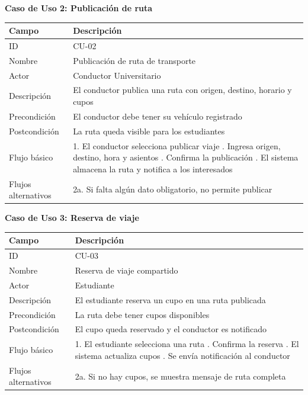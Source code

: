 \documentclass[11pt,a4paper]{article}
\begin{document}
\textbf{Caso de Uso 2: Publicación de ruta}

\begin{tabularx}{\textwidth}{|l|X|}
\hline
\textbf{Campo} & \textbf{Descripción} \\
\hline
ID & CU-02 \\
\hline
Nombre & Publicación de ruta de transporte \\
\hline
Actor & Conductor Universitario \\
\hline
Descripción & El conductor publica una ruta con origen, destino, horario y cupos \\
\hline
Precondición & El conductor debe tener su vehículo registrado \\
\hline
Postcondición & La ruta queda visible para los estudiantes \\
\hline
Flujo básico & 1. El conductor selecciona publicar viaje \newline 2. Ingresa origen, destino, hora y asientos \newline 3. Confirma la publicación \newline 4. El sistema almacena la ruta y notifica a los interesados \\
\hline
Flujos alternativos & 2a. Si falta algún dato obligatorio, no permite publicar \\
\hline
\end{tabularx}

\textbf{Caso de Uso 3: Reserva de viaje}

\begin{tabularx}{\textwidth}{|l|X|}
\hline
\textbf{Campo} & \textbf{Descripción} \\
\hline
ID & CU-03 \\
\hline
Nombre & Reserva de viaje compartido \\
\hline
Actor & Estudiante \\
\hline
Descripción & El estudiante reserva un cupo en una ruta publicada \\
\hline
Precondición & La ruta debe tener cupos disponibles \\
\hline
Postcondición & El cupo queda reservado y el conductor es notificado \\
\hline
Flujo básico & 1. El estudiante selecciona una ruta \newline 2. Confirma la reserva \newline 3. El sistema actualiza cupos \newline 4. Se envía notificación al conductor \\
\hline
Flujos alternativos & 2a. Si no hay cupos, se muestra mensaje de ruta completa \\
\hline
\end{tabularx}
\end{document}
